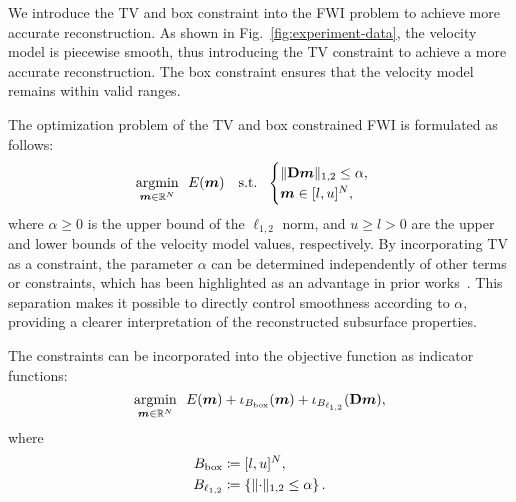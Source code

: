 %

We introduce the TV and box constraint into the FWI problem to achieve more accurate reconstruction.
As shown in Fig.~\ref{fig:experiment-data}, the velocity model is piecewise smooth, thus introducing the TV constraint to achieve a more accurate reconstruction.
The box constraint ensures that the velocity model remains within valid ranges.

The optimization problem of the TV and box constrained FWI is formulated as follows:
\begin{equation} \label{eq:FWIObjectiveWithTVConstraint} \argmin{\velModel \in \realNumber^N} \ \ \FWIObjectiveWithTVConstraint \end{equation}
where $\alpha \ge 0$ is the upper bound of the $\ell_{1,2}$ norm, and $u \ge l > 0$ are the upper and lower bounds of the velocity model values, respectively.
By incorporating TV as a constraint, the parameter $\alpha$ can be determined independently of other terms or constraints, which has been highlighted as an advantage in prior works~\cite{constraint0,constraint1,constraint2,constraint3,constraint4,constraints-vs-penalties-in-FWI}.
This separation makes it possible to directly control smoothness according to $\alpha$, providing a clearer interpretation of the reconstructed subsurface properties.

The constraints can be incorporated into the objective function as indicator functions:
\begin{equation} \label{eq:FWIObjectiveWithTVConstraintWithIndicatorFunction} \argmin{\velModel \in \realNumber^N} \ \ \FWIObjectiveWithTVConstraintWithIndicatorFunction, \end{equation}
where
\begin{equation}
    \label{eq:LOneTwoBallDefinition}
    \begin{aligned}[b]
        \BoxBall & \coloneqq [l,u]^N, \\
        \LOneTwoBall & \coloneqq \LOneTwoBallSetDefinition.
    \end{aligned}
\end{equation}


